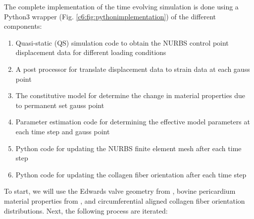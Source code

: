     The complete implementation of the time evolving simulation is done using a Python3 wrapper (Fig. \ref{c6:fig:pythonimplementation}) of the different components: 
    \begin{enumerate}[label=\Alph*]
        \item Quasi-static (QS) simulation code to obtain the NURBS control point displacement data for different loading conditions
        \item A post processor for translate displacement data to strain data at each gauss point
        \item The constitutive model for determine the change in material properties due to permanent set gauss point
        \item Parameter estimation code for determining the effective model parameters at each time step and gauss point
        \item Python code for updating the NURBS finite element mesh after each time step
        \item Python code for updating the collagen fiber orientation after each time step
    \end{enumerate}
    To start, we will use the Edwards valve geometry from \cite{aggarwal_inverse_2015}, bovine pericardium material properties from \cite{sacks_novel_2016}, and circumferential aligned collagen fiber orientation distributions. Next, the following process are iterated:

